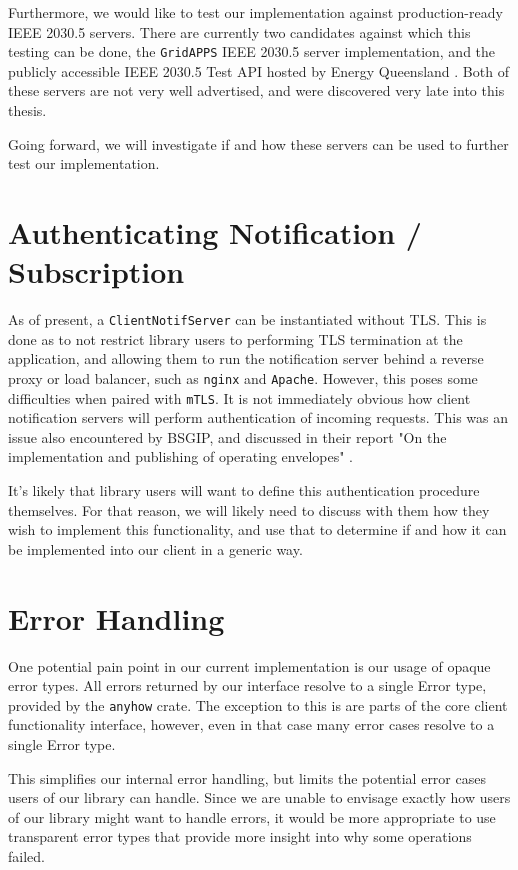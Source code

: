 Furthermore, we would like to test our implementation against production-ready IEEE 2030.5 servers. There are currently two candidates against which this testing can be done, the \texttt{GridAPPS} IEEE 2030.5 server implementation, and the publicly accessible IEEE 2030.5 Test API hosted by Energy Queensland \cite{sep2clienthandbook} \cite{gridapps}. Both of these servers are not very well advertised, and were discovered very late into this thesis.

Going forward, we will investigate if and how these servers can be used to further test our implementation.

\section{Authenticating Notification / Subscription}
As of present, a \texttt{ClientNotifServer} can be instantiated without TLS. This is done as to not restrict library users to performing TLS termination at the application, and allowing them to run the notification server behind a reverse proxy or load balancer, such as \texttt{nginx} and \texttt{Apache}. 
However, this poses some difficulties when paired with \texttt{mTLS}. It is not immediately obvious how client notification servers will perform authentication of incoming requests. This was an issue also encountered  by BSGIP, and discussed in their report "On the implementation and publishing of operating envelopes" \cite{envoyclient}.

It's likely that library users will want to define this authentication  procedure themselves. For that reason, we will likely need to discuss with them how they wish to implement this functionality, and use that to determine if and how it can be implemented into our client in a generic way.

\section{Error Handling}
One potential pain point in our current implementation is our usage of opaque error types. All errors returned by our interface resolve to a single Error type, provided by the \texttt{anyhow} crate. The exception to this is are parts of the core client functionality interface, however, even in that case many error cases resolve to a single Error type. 

This simplifies our internal error handling, but limits the potential error cases users of our library can handle. Since we are unable to envisage exactly how users of our library might want to handle errors, it would be more appropriate to use transparent error types that provide more insight into why some operations failed.

